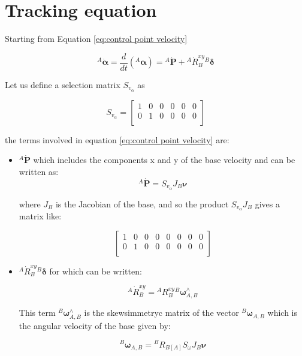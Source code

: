 \section{Tracking equation}
\label{sec:Tracking equation}

Starting from Equation \eqref{eq:control point velocity}

\begin{equation*}
    {}^{A} \dot{\bm{\alpha}} = \frac{d}{dt} ({}^{A} \bm{\alpha}) = {}^{A} \dot{\mathbf{P}} + {}^{A} \dot{R}_B^{xy} {}^{B} \bm{\delta}
\end{equation*}

Let us define a selection matrix $S_{v_{\alpha}}$ as

\begin{equation*}
 S_{v_{\alpha}} = \begin{bmatrix}
 1 & 0 & 0 & 0 & 0 & 0 \\
 0 & 1 & 0 & 0 & 0 & 0 \\
\end{bmatrix}
\end{equation*}

the terms involved in equation \eqref{eq:control point velocity} are:

\begin{itemize}
    \item ${}^{A} \dot{\mathbf{P}}$ which includes the components x and y of the base velocity and can be written as: 
\begin{equation*}
    {}^{A} \dot{\mathbf{P}} = S_{v_{\alpha}}J_{B}\bm{\nu}
\end{equation*}

where $J_{B}$ is the Jacobian of the base, and so the product $S_{v_{\alpha}}J_{B}$ gives a matrix like:

\begin{equation*}
    \begin{bmatrix} 
        1 & 0 & 0 & 0 & 0 & 0 & 0 & 0 \\
        0 & 1 & 0 & 0 & 0 & 0 & 0 & 0 \\
    \end{bmatrix}
\end{equation*}

\item ${}^{A} \dot{R}^{xy}_{B} {}^{B} \bm{\delta}$ for which can be written:

\begin{equation*}
{}^{A} \dot{R}^{xy}_{B} = {}^{A}R^{xy}_{B} {}^{B}\bm{\omega}^{\wedge{}}_{A,B}
\end{equation*}


This term ${}^{B}\bm{\omega}^{\wedge{}}_{A,B}$ is the skewsimmetryc matrix of the vector ${}^{B}\bm{\omega}_{A,B}$ which is the angular velocity of the base given by:

\begin{equation*}
  {}^{B}\bm{\omega}_{A,B} =  {}^{B}R_{B[A]}S_{\omega}J_{B}\bm{\nu}  
\end{equation*}


\end{itemize}

